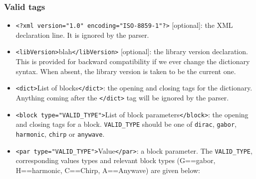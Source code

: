 \documentclass[11pt,a4paper]{article}
\begin{document}
\subsubsection*{Valid tags}
\begin{itemize}

\item \verb+<?xml version="1.0" encoding="ISO-8859-1"?>+ [optional]: the XML
  declaration line. It is ignored by the parser.
  
\item \verb+<libVersion>+blah\verb+</libVersion>+ [optional]: the library
  version declaration. This is provided for backward compatibility if we ever
  change the dictionary syntax. When absent, the library version is taken to be
  the current one.

\item \verb+<dict>+List of blocks\verb+</dict>+: the opening and closing tags
  for the dictionary. Anything coming after the \verb+</dict>+ tag will be
  ignored by the parser.
  
\item \verb+<block type="VALID_TYPE">+List of block parameters\verb+</block>+:
  the opening and closing tags for a block.  \verb+VALID_TYPE+ should be one of
  \verb+dirac+, \verb+gabor+, \verb+harmonic+, \verb+chirp+ or \verb+anywave+.
  
\item \verb+<par type="VALID_TYPE">+Value\verb+</par>+: a block parameter. The
  \verb+VALID_TYPE+, corresponding values types and relevant block types
  (G==gabor, H==harmonic, C==Chirp, A==Anywave) are given below:
\end{itemize}
\end{document}
